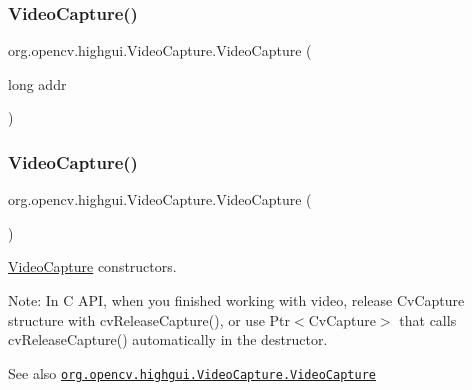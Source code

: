 \subsubsection{\texorpdfstring{Video\+Capture()}{VideoCapture()}\hspace{0.1cm}{\footnotesize\ttfamily [1/3]}}
{\footnotesize\ttfamily org.\+opencv.\+highgui.\+Video\+Capture.\+Video\+Capture (\begin{DoxyParamCaption}\item[{long}]{addr }\end{DoxyParamCaption})\hspace{0.3cm}{\ttfamily [protected]}}

\mbox{\label{classorg_1_1opencv_1_1highgui_1_1_video_capture_a7c6a4c2222f20a8dee2cdb20eb5dbe55}} 
\subsubsection{\texorpdfstring{Video\+Capture()}{VideoCapture()}\hspace{0.1cm}{\footnotesize\ttfamily [2/3]}}
{\footnotesize\ttfamily org.\+opencv.\+highgui.\+Video\+Capture.\+Video\+Capture (\begin{DoxyParamCaption}{ }\end{DoxyParamCaption})}

\mbox{\hyperlink{classorg_1_1opencv_1_1highgui_1_1_video_capture}{Video\+Capture}} constructors.

Note\+: In C A\+PI, when you finished working with video, release {\ttfamily Cv\+Capture} structure with {\ttfamily cv\+Release\+Capture()}, or use {\ttfamily Ptr$<$\+Cv\+Capture$>$} that calls {\ttfamily cv\+Release\+Capture()} automatically in the destructor.

\begin{DoxySeeAlso}{See also}
\href{http://docs.opencv.org/modules/highgui/doc/reading_and_writing_images_and_video.html#videocapture-videocapture}{\tt org.\+opencv.\+highgui.\+Video\+Capture.\+Video\+Capture} 
\end{DoxySeeAlso}
\mbox{\label{classorg_1_1opencv_1_1highgui_1_1_video_capture_a4f451acfdc7f7abe0959c615b6c6407a}} 
